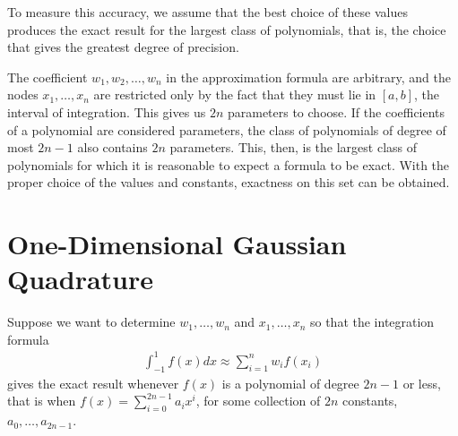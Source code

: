 \documentclass[a4paper]{article}
\numberwithin{equation}{section}
\begin{document}
To measure this accuracy, we assume that the best choice of these values produces the exact result for the largest class of polynomials, that is, the choice that gives the greatest degree of precision.

The coefficient $w_1,w_2,\ldots,w_n$ in the approximation formula are arbitrary, and the nodes $x_1,\ldots,x_n$ are restricted only by the fact that they must lie in $\left[a,b\right]$, the interval of integration. This gives us $2n$ parameters to choose. If the coefficients of a polynomial are considered parameters, the class of polynomials of degree of most $2n-1$ also contains $2n$ parameters. This, then, is the largest class of polynomials for which it is reasonable to expect a formula to be exact. With the proper choice of the values and constants, exactness on this set can be obtained.
\section{One-Dimensional Gaussian Quadrature}
Suppose we want to determine $w_1,\ldots,w_n$ and $x_1,\ldots,x_n$ so that the integration formula
\begin{align}
\int_{ - 1}^1 {f\left( x \right)dx}  \approx \sum\limits_{i = 1}^n {{w_i}f\left( {{x_i}} \right)} 
\end{align}
gives the exact result whenever $f\left(x\right)$ is a polynomial of degree $2n-1$ or less, that is when $f\left( x \right) = \sum\limits_{i = 0}^{2n-1} {{a_i}{x^i}}$, for some collection of $2n$ constants, $a_0,\ldots,a_{2n-1}$. 
\end{document}
